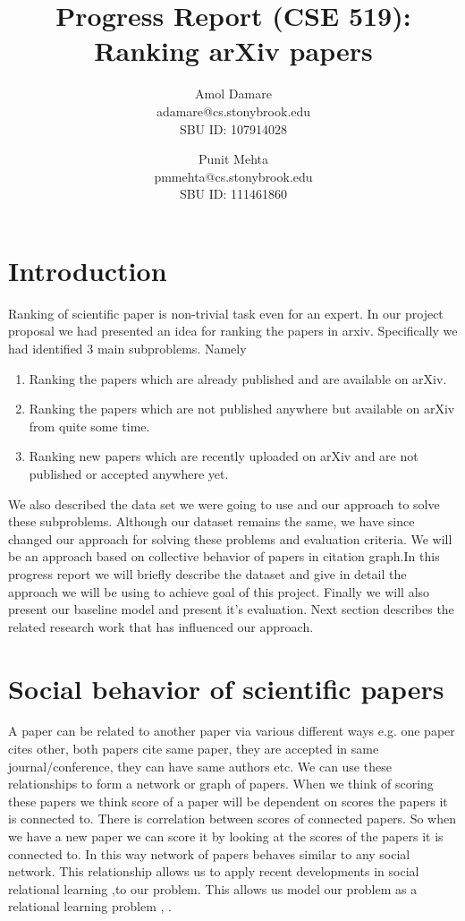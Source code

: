 \documentclass[a4paper, 11pt]{article}
\begin{document}
\title{Progress Report (CSE 519): Ranking arXiv papers}

\author{Amol Damare \\ adamare@cs.stonybrook.edu \\SBU ID: 107914028
\and
Punit Mehta \\  pmmehta@cs.stonybrook.edu \\SBU ID: 111461860}
\maketitle

\section{Introduction}
Ranking of scientific paper is non-trivial task even for an expert. In our project proposal we had presented an idea for ranking the papers in arxiv. Specifically we had identified 3 main subproblems. Namely \\
\begin{enumerate}
\item Ranking the papers which are already published and are available on arXiv.
\item Ranking the papers which are not published anywhere but available on arXiv from quite some time.
\item Ranking new papers which are recently uploaded on arXiv and are not published or accepted anywhere yet.
\end{enumerate}
We also described the data set we were going to use and our approach to solve these subproblems. Although our dataset remains the same, we have since changed our approach for solving these problems and evaluation criteria. We will be an approach based on collective behavior of papers in citation graph.In this progress report we will briefly describe the dataset and give in detail the approach we will be using to achieve goal of this project. Finally we will also present our baseline model and present it's evaluation. Next section describes the related research work  that has influenced our approach.
\section{Social behavior of scientific papers}
A paper can be related to another paper via various different ways e.g. one paper cites other, both papers cite same paper, they are accepted in same journal/conference, they can have same authors etc. We can use these relationships to form a network or graph of papers. When we think of scoring these papers we think score of a paper will be dependent on scores the papers it is connected to. There is correlation between scores of connected papers. So when we have a new paper we can score it by looking at the scores of the papers it is connected to. In this way network of papers behaves similar to any social network. This relationship allows us to apply recent developments in social relational learning \cite{deepwalk}  ,\cite{tang2011leveraging}to our problem. This allows us model our problem as a relational learning problem \cite{tang2009scalable}, \cite{tang2009relational}. 
\end{document}
